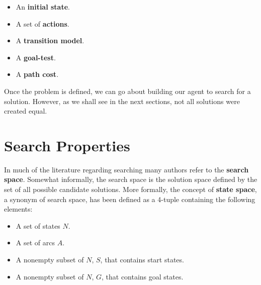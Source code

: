 \documentclass[a4paper,11pt]{report}
\begin{document}
\begin{itemize}
\item An \textbf{initial state}.
\item A set of \textbf{actions}.
\item A \textbf{transition model}.
\item A \textbf{goal-test}.
\item A \textbf{path cost}.\cite{norvig}
\end{itemize}

Once the problem is defined, we can go about building our agent to search for
a solution.  However, as we shall see in the next sections, not all solutions
were created equal.

\section{Search Properties}
In much of the literature regarding searching many authors refer to the
\textbf{search space}.  Somewhat informally, the search space is the solution
space defined by the set of all possible candidate solutions.\cite{wikiSpace}
More formally, the concept of \textbf{state space}, a synonym of search space,
has been defined as a 4-tuple containing the following elements:

\begin{itemize}
\item A set of states $N$.
\item A set of arcs $A$.
\item A nonempty subset of $N$, $S$, that contains start states.
\item A nonempty subset of $N$, $G$, that contains goal states.\cite{zhang99}
\end{itemize}
\end{document}
